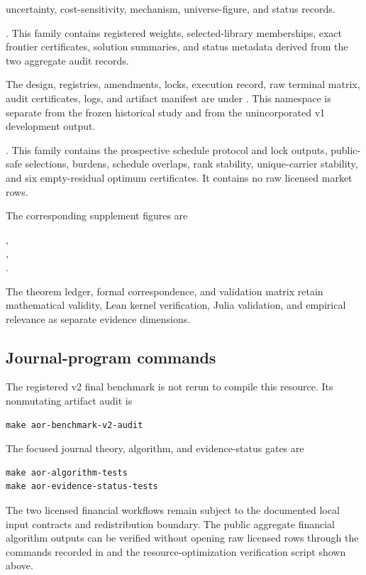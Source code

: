 \begin{description}
  uncertainty, cost-sensitivity, mechanism, universe-figure, and status
  records.
  \item[Cross-audit financial resource optimization.]
  .  This family contains registered
  weights, selected-library memberships, exact frontier certificates,
  solution summaries, and status metadata derived from the two aggregate
  audit records.
  \item[Registered Algorithmic Compression Benchmark v2.]
  The design, registries, amendments, locks, execution record, raw terminal
  matrix, audit certificates, logs, and artifact manifest are under
  . This namespace is separate
  from the frozen  historical study and from the
  unincorporated v1 development output.
  \item[Locked financial weight robustness.]
  . This family
  contains the prospective schedule protocol and lock outputs, public-safe
  selections, burdens, schedule overlaps, rank stability, unique-carrier
  stability, and six empty-residual optimum certificates. It contains no raw
  licensed market rows.
\end{description}

The corresponding supplement figures are
\begin{center}
,\\
,\\
.
\end{center}
The theorem ledger, formal correspondence, and validation matrix retain
mathematical validity, Lean kernel verification, Julia validation, and
empirical relevance as separate evidence dimensions.

\subsection{Journal-program commands}

The registered v2 final benchmark is not rerun to compile this resource. Its
nonmutating artifact audit is
\begin{verbatim}
make aor-benchmark-v2-audit
\end{verbatim}
The focused journal theory, algorithm, and evidence-status gates are
\begin{verbatim}
make aor-algorithm-tests
make aor-evidence-status-tests
\end{verbatim}
The two licensed financial workflows remain subject to the documented local
input contracts and redistribution boundary. The public aggregate financial
algorithm outputs can be verified without opening raw licensed rows through
the commands recorded in  and the resource-optimization
verification script shown above.


